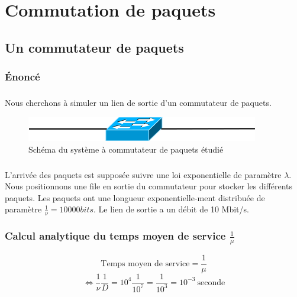 %
\chapter{Commutation de paquets}
%
    \section{Un commutateur de paquets}
%
        \subsection{Énoncé}
%
            \paragraph{}
Nous cherchons à simuler un lien de sortie d'un commutateur de paquets.
%
            \begin{figure}[h]
                \centering
                \includegraphics[scale=0.5]{RSC/2-0.png}
                \caption{ Schéma du système à commutateur de paquets étudié }
                \label{ Schema du systeme a commutateur de paquets }
            \end{figure}
%
            \paragraph{}
L'arrivée des paquets est supposée suivre une loi exponentielle de paramètre $\lambda$.
Nous positionnons une file en sortie du commutateur pour stocker les différents paquets.
Les paquets ont une longueur exponentielle-ment distribuée de paramètre $\frac{1}{\nu} = 10 000 bits$.
Le lien de sortie a un débit de 10 Mbit/s.
%
        \subsection{Calcul analytique du temps moyen de service $\frac{1}{\mu}$}
\[  \text{Temps moyen de service} = \frac{1}{\mu} \]
\[ \iff \frac{1}{\nu} \frac{1}{D} = 10^{4} \frac{1}{10^{7}} = \frac{1}{10^{3}} = 10^{-3} \ \text{seconde} \]
%
